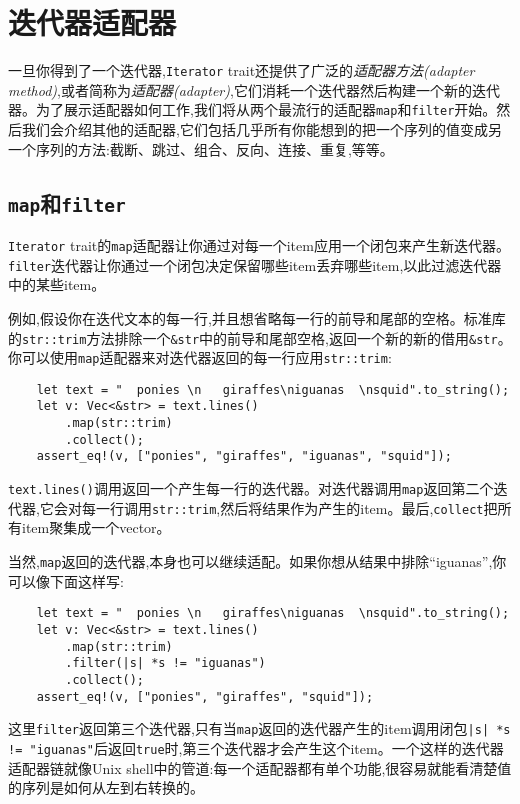 \section{迭代器适配器}

一旦你得到了一个迭代器,\texttt{Iterator} trait还提供了广泛的\emph{适配器方法(adapter method)},或者简称为\emph{适配器(adapter)},它们消耗一个迭代器然后构建一个新的迭代器。为了展示适配器如何工作,我们将从两个最流行的适配器\texttt{map}和\texttt{filter}开始。然后我们会介绍其他的适配器,它们包括几乎所有你能想到的把一个序列的值变成另一个序列的方法:截断、跳过、组合、反向、连接、重复,等等。

\subsection{\texttt{map}和\texttt{filter}}
\texttt{Iterator} trait的\texttt{map}适配器让你通过对每一个item应用一个闭包来产生新迭代器。\texttt{filter}迭代器让你通过一个闭包决定保留哪些item丢弃哪些item,以此过滤迭代器中的某些item。

例如,假设你在迭代文本的每一行,并且想省略每一行的前导和尾部的空格。标准库的\texttt{str::trim}方法排除一个\texttt{\&str}中的前导和尾部空格,返回一个新的新的借用\texttt{\&str}。你可以使用\texttt{map}适配器来对迭代器返回的每一行应用\texttt{str::trim}:
\begin{verbatim}
    let text = "  ponies \n   giraffes\niguanas  \nsquid".to_string();
    let v: Vec<&str> = text.lines()
        .map(str::trim)
        .collect();
    assert_eq!(v, ["ponies", "giraffes", "iguanas", "squid"]);
\end{verbatim}

\texttt{text.lines()}调用返回一个产生每一行的迭代器。对迭代器调用\texttt{map}返回第二个迭代器,它会对每一行调用\texttt{str::trim},然后将结果作为产生的item。最后,\texttt{collect}把所有item聚集成一个vector。

当然,\texttt{map}返回的迭代器,本身也可以继续适配。如果你想从结果中排除“iguanas”,你可以像下面这样写:
\begin{verbatim}
    let text = "  ponies \n   giraffes\niguanas  \nsquid".to_string();
    let v: Vec<&str> = text.lines()
        .map(str::trim)
        .filter(|s| *s != "iguanas")
        .collect();
    assert_eq!(v, ["ponies", "giraffes", "squid"]);
\end{verbatim}

这里\texttt{filter}返回第三个迭代器,只有当\texttt{map}返回的迭代器产生的item调用闭包\texttt{|s| *s != "iguanas"}后返回\texttt{true}时,第三个迭代器才会产生这个item。一个这样的迭代器适配器链就像Unix shell中的管道:每一个适配器都有单个功能,很容易就能看清楚值的序列是如何从左到右转换的。

